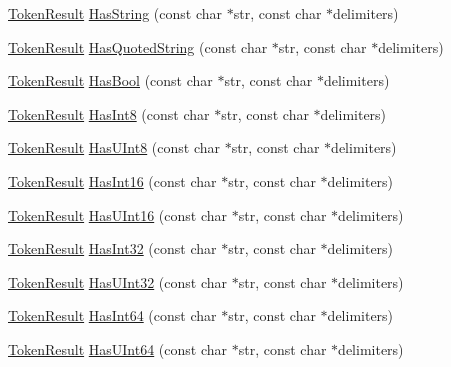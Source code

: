 \begin{DoxyCompactItemize}
\hyperlink{namespacemage_a2178ba2411db5912f41b2e7698c2037d}{Token\+Result} \hyperlink{namespacemage_aee4453ab304c7abc50f3b6f8ff53ce19}{Has\+String} (const char $\ast$str, const char $\ast$delimiters)
\item 
\hyperlink{namespacemage_a2178ba2411db5912f41b2e7698c2037d}{Token\+Result} \hyperlink{namespacemage_aae5d7c6c8ff6dcd039a3c5afaafeb241}{Has\+Quoted\+String} (const char $\ast$str, const char $\ast$delimiters)
\item 
\hyperlink{namespacemage_a2178ba2411db5912f41b2e7698c2037d}{Token\+Result} \hyperlink{namespacemage_ab8d3a7642225fabd1e78f0e1fc49f1fe}{Has\+Bool} (const char $\ast$str, const char $\ast$delimiters)
\item 
\hyperlink{namespacemage_a2178ba2411db5912f41b2e7698c2037d}{Token\+Result} \hyperlink{namespacemage_aeb74d3691c0033e4df9a4dd3aec28f14}{Has\+Int8} (const char $\ast$str, const char $\ast$delimiters)
\item 
\hyperlink{namespacemage_a2178ba2411db5912f41b2e7698c2037d}{Token\+Result} \hyperlink{namespacemage_ad4371436b14bc05f22abde780bf07be5}{Has\+U\+Int8} (const char $\ast$str, const char $\ast$delimiters)
\item 
\hyperlink{namespacemage_a2178ba2411db5912f41b2e7698c2037d}{Token\+Result} \hyperlink{namespacemage_acb619a437a47ef3212c2fc71fdfa33b6}{Has\+Int16} (const char $\ast$str, const char $\ast$delimiters)
\item 
\hyperlink{namespacemage_a2178ba2411db5912f41b2e7698c2037d}{Token\+Result} \hyperlink{namespacemage_a1dd9c4b40b7b0e084a3014f8fd9f26ca}{Has\+U\+Int16} (const char $\ast$str, const char $\ast$delimiters)
\item 
\hyperlink{namespacemage_a2178ba2411db5912f41b2e7698c2037d}{Token\+Result} \hyperlink{namespacemage_a78f76aec12a47505136e00224e4bf9ce}{Has\+Int32} (const char $\ast$str, const char $\ast$delimiters)
\item 
\hyperlink{namespacemage_a2178ba2411db5912f41b2e7698c2037d}{Token\+Result} \hyperlink{namespacemage_a2b7625293b098b935d6fe3b251573018}{Has\+U\+Int32} (const char $\ast$str, const char $\ast$delimiters)
\item 
\hyperlink{namespacemage_a2178ba2411db5912f41b2e7698c2037d}{Token\+Result} \hyperlink{namespacemage_a59d8d6302b2f0cd017dfa2217ac536b0}{Has\+Int64} (const char $\ast$str, const char $\ast$delimiters)
\item 
\hyperlink{namespacemage_a2178ba2411db5912f41b2e7698c2037d}{Token\+Result} \hyperlink{namespacemage_a49b54d6a4244d71dc63237ead3a6307e}{Has\+U\+Int64} (const char $\ast$str, const char $\ast$delimiters)

\end{DoxyCompactItemize}
